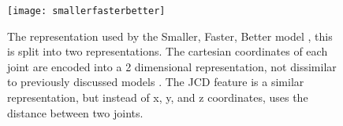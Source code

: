 \begin{figure}[ht]
	\texttt{[image: smallerfasterbetter]}
	\centering
	\caption{The representation used by the Smaller, Faster, Better model \cite{smaller_faster_better}, this is split into two representations. The cartesian coordinates of each joint are encoded into a 2 dimensional representation, not dissimilar to previously discussed models \cite{simple_yet_efficient}. The JCD feature is a similar representation, but instead of x, y, and z coordinates, uses the distance between two joints.}
	\label{fig:smallerfasterbetter}
\end{figure}
